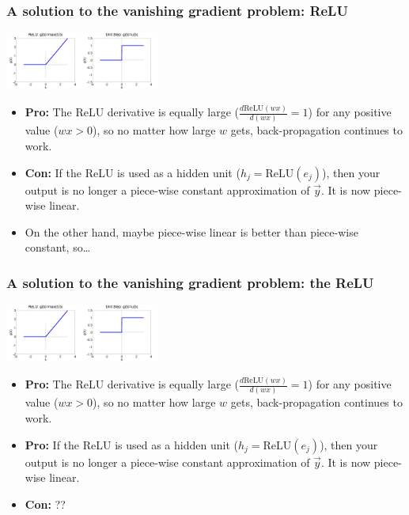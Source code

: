 \documentclass{beamer}
\begin{document}
\begin{frame}
  \frametitle{A solution to the vanishing gradient problem: ReLU}
  \centerline{\includegraphics[width=1in]{../lec07/figs/nn_relu.png}\includegraphics[width=1in]{../lec07/figs/nn_unitstep.png}}

  \begin{itemize}
    \item {\bf Pro:} The ReLU derivative is equally large
      ($\frac{d\mbox{ReLU}(wx)}{d(wx)}=1$) for any positive value
      ($wx>0$), so no matter how large $w$ gets, back-propagation
      continues to work.
    \item {\bf Con:} If the ReLU is used as a hidden unit
      ($h_j=\mbox{ReLU}(e_j)$), then your output is no longer a
      piece-wise constant approximation of $\vec{y}$.  It is now
      piece-wise linear.
    \item On the other hand, maybe piece-wise linear is
      better than piece-wise constant, so\ldots
  \end{itemize}
\end{frame}
      
\begin{frame}
  \frametitle{A solution to the vanishing gradient problem: the ReLU}
  \centerline{\includegraphics[width=1in]{../lec07/figs/nn_relu.png}\includegraphics[width=1in]{../lec07/figs/nn_unitstep.png}}

  \begin{itemize}
    \item {\bf Pro:} The ReLU derivative is equally large
      ($\frac{d\mbox{ReLU}(wx)}{d(wx)}=1$) for any positive value
      ($wx>0$), so no matter how large $w$ gets, back-propagation
      continues to work.
    \item {\bf Pro:} If the ReLU is used as a hidden unit
      ($h_j=\mbox{ReLU}(e_j)$), then your output is no longer a
      piece-wise constant approximation of $\vec{y}$.  It is now
      piece-wise linear.
    \item {\bf Con:} ??
  \end{itemize}
\end{frame}
\end{document}
